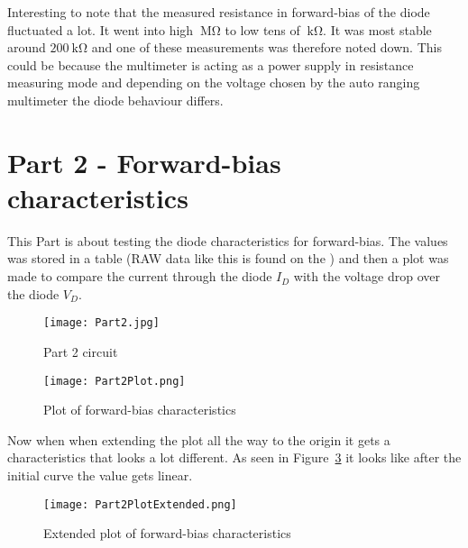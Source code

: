\documentclass{article}
\begin{document}
Interesting to note that the measured resistance in forward-bias of the diode fluctuated a lot. It went into high \(\SI{}{\mega\ohm}\) to low tens of \(\SI{}{\kilo\ohm}\). It was most stable around \(\SI{200}{\kilo\ohm}\) and one of these measurements was therefore noted down. This could be because the multimeter is acting as a power supply in resistance measuring mode and depending on the voltage chosen by the auto ranging multimeter the diode behaviour differs.



\section{Part 2 - Forward-bias characteristics}
This Part is about testing the diode characteristics for forward-bias. The values was stored in a table (RAW data like this is found on the ) and then a plot was made to compare the current through the diode \(I_D\) with the voltage drop over the diode \(V_D\).


\begin{figure}[h] %
    \centering
    \texttt{[image: Part2.jpg]}
    \caption{Part 2 circuit}
    \label{fig:Part2}
\end{figure}

\clearpage


\begin{figure}[h] %
    \centering
    \texttt{[image: Part2Plot.png]}
    \caption{Plot of forward-bias characteristics}
    \label{fig:Part2Plot}
\end{figure}

Now when when extending the plot all the way to the origin it gets a characteristics that looks a lot different. As seen in Figure~\ref{fig:Part2PlotExtended} it looks like after the initial curve the value gets linear.

\clearpage


\begin{figure}[h] %
    \centering
    \texttt{[image: Part2PlotExtended.png]}
    \caption{Extended plot of forward-bias characteristics}
    \label{fig:Part2PlotExtended}
\end{figure}
\end{document}
